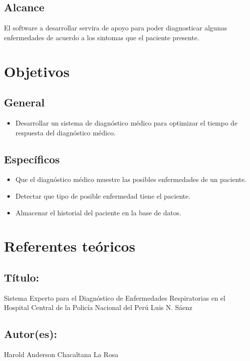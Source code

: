 \documentclass[preprint,12pt]{elsarticle}
\begin{document}
	\subsection{\textbf{ Alcance }}
El software a desarrollar servira de apoyo para poder diagnosticar algunas enfermedades de acuerdo a los sintomas que el paciente presente.

\section{Objetivos}
	\subsection{\textbf{ General }}
		\begin{itemize}
			\item Desarrollar un sistema de diagnóstico médico para optimizar el tiempo de respuesta del diagnóstico médico.
		\end{itemize}
	\subsection{\textbf{Específicos }}

\begin{itemize}
	\item Que el diagnóstico médico muestre las posibles enfermedades de un paciente.
	\item Detectar que tipo de posible enfermedad tiene el paciente. 
	\item Almacenar el historial del paciente en la base de datos. 
\end{itemize}

\section{Referentes teóricos}

\subsection{Título:} Sistema Experto para el Diagnóstico de Enfermedades Respiratorias en el Hospital Central de la Policía Nacional del Perú Luis N. Sáenz

\subsection{Autor(es):} Harold Anderson Chacaltana La Rosa
\end{document}
